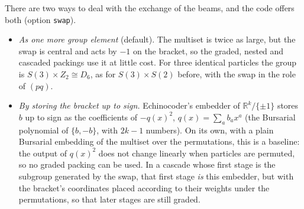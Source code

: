 \documentclass[11pt]{article}
\theoremstyle{definition}
\theoremstyle{remark}
\begin{document}
There are two ways to deal with the exchange of the beams, and the code offers
both (option \texttt{swap}).
\begin{itemize}
  \item[(B)] \emph{As one more group element} (default). The multiset is twice
    as large, but the swap is central and acts by $-1$ on the bracket, so the
    graded, nested and cascaded packings use it at little cost. For three
    identical particles the group is $S(3)\times Z_2 \cong D_6$, as for
    $S(3)\times S(2)$ before, with the swap in the role of $(pq)$.
  \item[(A)] \emph{By storing the bracket up to sign.} Echinocoder's embedder of
    $\mathbb{R}^k/\{\pm1\}$ stores $b$ up to sign as the coefficients of
    $-q(x)^2$, $q(x) = \sum_a b_a x^a$ (the Bursarial polynomial of
    $\{b, -b\}$, with $2k - 1$ numbers). On its own, with a plain Bursarial
    embedding of the multiset over the permutations, this is a baseline: the
    output of $q(x)^2$ does not change linearly when particles are permuted,
    so no graded packing can be used. In a cascade whose first stage is the
    subgroup generated by the swap, that first stage \emph{is} this embedder,
    but with the bracket's coordinates placed according to their weights under
    the permutations, so that later stages are still graded.
\end{itemize}
\end{document}

